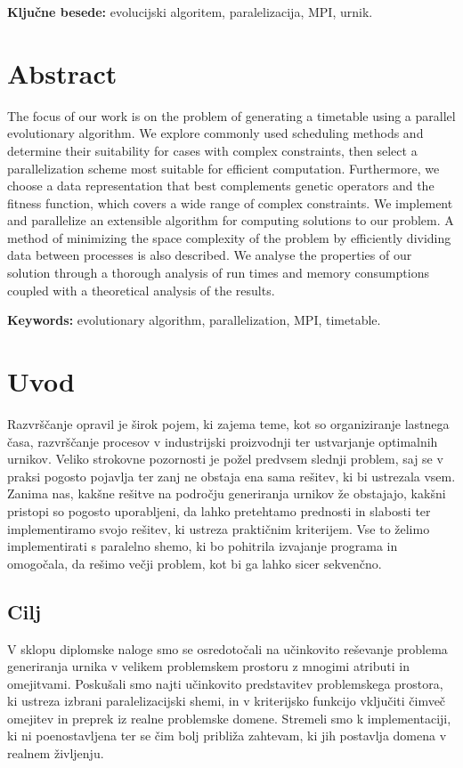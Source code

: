 \documentclass[a4paper,12pt]{book}
\newcommand{\tkeywords}{evolucijski algoritem, paralelizacija, MPI, urnik}
\newcommand{\tkeywordsEn}{evolutionary algorithm, parallelization, MPI, timetable}
\newcommand{\clearemptydoublepage}{\newpage{\pagestyle{empty}\cleardoublepage}}
\begin{document}
\noindent\textbf{Ključne besede:} \tkeywords.
\clearemptydoublepage

\chapter*{Abstract}
The focus of our work is on the problem of generating a timetable using a parallel evolutionary algorithm. We explore commonly used scheduling methods and determine their suitability for cases with complex constraints, then select a parallelization scheme most suitable for efficient computation. Furthermore, we choose a data representation that best complements genetic operators and the fitness function, which covers a wide range of complex constraints. We implement and parallelize an extensible algorithm for computing solutions to our problem. A method of minimizing the space complexity of the problem by efficiently dividing data between processes is also described. We analyse the properties of our solution through a thorough analysis of run times and memory consumptions coupled with a theoretical analysis of the results. 
\bigskip

\noindent\textbf{Keywords:} \tkeywordsEn.
\clearemptydoublepage

\mainmatter
\setcounter{page}{1}
\pagestyle{fancy}


\chapter{Uvod}
Razvrščanje opravil je širok pojem, ki zajema teme, kot so organiziranje lastnega časa, razvrščanje procesov v industrijski proizvodnji ter ustvarjanje optimalnih urnikov. Veliko strokovne pozornosti je požel predvsem slednji problem, saj se v praksi pogosto pojavlja ter zanj ne obstaja ena sama rešitev, ki bi ustrezala vsem. Zanima nas, kakšne rešitve na področju generiranja urnikov že obstajajo, kakšni pristopi so pogosto uporabljeni, da lahko pretehtamo prednosti in slabosti ter implementiramo svojo rešitev, ki ustreza praktičnim kriterijem. Vse to želimo implementirati s paralelno shemo, ki bo pohitrila izvajanje programa in omogočala, da rešimo večji problem, kot bi ga lahko sicer sekvenčno. 


\section{Cilj}
V sklopu diplomske naloge smo se osredotočali na učinkovito reševanje problema generiranja urnika v velikem problemskem prostoru z mnogimi atributi in omejitvami. Poskušali smo najti učinkovito predstavitev problemskega prostora, ki ustreza izbrani paralelizacijski shemi, in v kriterijsko funkcijo vključiti čimveč omejitev in preprek iz realne problemske domene. Stremeli smo k implementaciji, ki ni poenostavljena ter se čim bolj približa zahtevam, ki jih postavlja domena v realnem življenju. 
\end{document}
